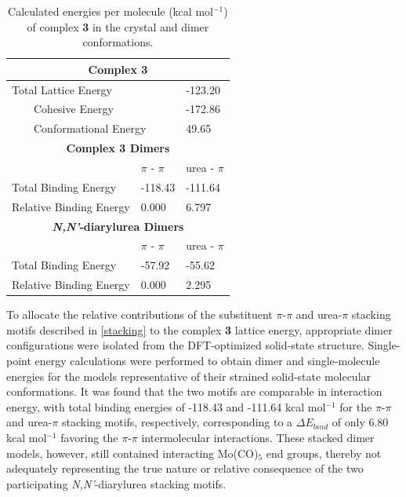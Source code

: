 \begin{table}[]
\centering
\caption{Calculated energies per molecule (kcal mol$^{-1}$) of complex \textbf{3} in the crystal and dimer conformations.} \label{tab:3-energies}
\begin{tabular}{lll}
\multicolumn{3}{c}{\textbf{Complex 3}} \\ \hline
\multicolumn{2}{l}{Total Lattice Energy} & -123.20 \\
\multicolumn{2}{l}{~~~~Cohesive Energy} & -172.86 \\
\multicolumn{2}{l}{~~~~Conformational Energy} & 49.65 \\
\multicolumn{3}{c}{\rule{0pt}{5ex} \textbf{Complex 3 Dimers}} \\ \hline
 & $\pi$ - $\pi$ & urea - $\pi$ \\
Total Binding Energy & -118.43 & -111.64 \\
Relative Binding Energy & 0.000 & 6.797 \\
\multicolumn{3}{c}{\rule{0pt}{5ex} \textbf{\textit{N,N'}‑diarylurea Dimers}} \\ \hline
 & $\pi$ - $\pi$ & urea - $\pi$ \\
Total Binding Energy & -57.92 & -55.62 \\
Relative Binding Energy & 0.000 & 2.295 \\ \hline
\end{tabular}
\end{table}

To allocate the relative contributions of the substituent $\pi$-$\pi$ and urea-$\pi$ stacking motifs described in \autoref{stacking} to the complex \textbf{3} lattice energy, appropriate dimer configurations were isolated from the DFT-optimized solid-state structure. Single-point energy calculations were performed to obtain dimer and single-molecule energies for the models representative of their strained solid-state molecular conformations. It was found that the two motifs are comparable in interaction energy, with total binding energies of -118.43 and -111.64 kcal mol$^{-1}$ for the $\pi$-$\pi$ and urea-$\pi$ stacking motifs, respectively, corresponding to a $\Delta E_{bind}$  of only 6.80 kcal mol$^{-1}$ favoring the $\pi$-$\pi$ intermolecular interactions. These stacked dimer models, however, still contained interacting Mo(CO)$_{5}$ end groups, thereby not adequately representing the true nature or relative consequence of the two participating \textit{N,N'}-diarylurea stacking motifs.

